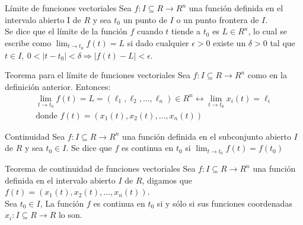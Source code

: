 \documentclass[a4paper, twoside]{article}
\numberwithin{equation}{section}
\numberwithin{figure}{section}
\numberwithin{table}{section}
\begin{document}
\begin{definicion*}{Límite de funciones vectoriales}
	Sea $f:I\subseteq R \to R^n$ una función definida en el intervalo abierto I de $R$ y sea $t_0$ un punto de $I$ o un punto frontera de $I$.\\
	
	Se dice que el límite de la función $f$ cuando $t$ tiende a $t_0$ es $L \in R^n$, lo cual se escribe como $\lim_{t \to t_0}f(t)=L$ si dado cualquier $\epsilon>0$ existe un $\delta>0$ tal que $t \in I,\:0<|t-t_0|<\delta \Rightarrow |f(t)-L|<\epsilon$.
\end{definicion*}

\begin{teorema*}{Teorema para el límite de funciones vectoriales}
	Sea $f:I\subseteq R \to R^n$ como en la definición anterior. Entonces:
	\begin{align}
		\lim_{t \to t_0}f(t) = L = (\ell_1,\ell_2,\ldots,\ell_n) \in R^n \longleftrightarrow \lim_{t \to t_0}x_i (t) = \ell_i \\
		\text{donde } f(t)=(x_1(t),x_2(t),\ldots,x_n(t))
	\end{align}
\end{teorema*}

\begin{definicion*}{Continuidad}
	Sea $f:I\subseteq R \to R^n$ una función definida en el subconjunto abierto $I$ de $R$ y sea $t_0 \in I$. Se dice que $f$ es continua en $t_0$ si $\lim_{t \to t_0}f(t)=f(t_0)$
\end{definicion*}

\begin{teorema*}{Teorema de continuidad de funciones vectoriales}
	Sea $f: I \subseteq R \to R^n$ una función definida en el intervalo abierto $I$ de $R$, digamos que $f(t) = (x_1(t),x_2(t),\ldots,x_n(t))$.\\
	
	Sea $t_0 \in I$, La función $f$ es continua en $t_0$ si y sólo si sus funciones coordenadas $x_i: I \subseteq R \to R$ lo son.
\end{teorema*}
\end{document}
